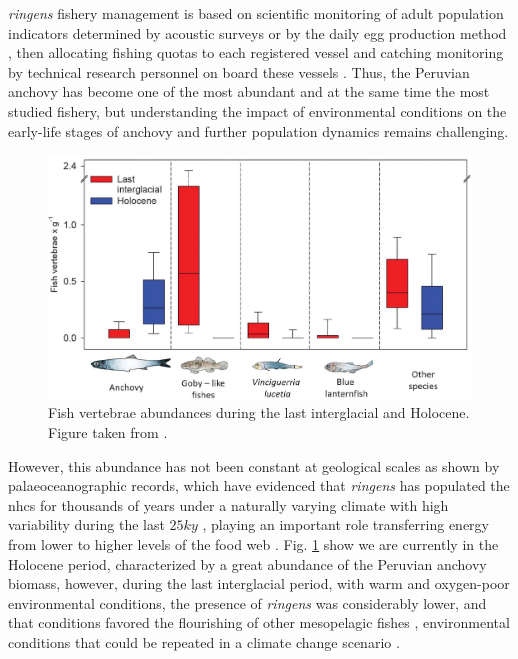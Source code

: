 \textit{\gls{ringens}} fishery management is based on scientific monitoring of adult population indicators determined by acoustic surveys \citep{GutiSwar2007} or by the daily egg production method \citep{Ayon2000}, then allocating fishing quotas to each registered vessel and catching monitoring by technical research personnel on board these vessels \citep{KroeSanc2019}. Thus, the Peruvian anchovy has become one of the most abundant and at the same time the most studied fishery, but understanding the impact of environmental conditions on the early-life stages of anchovy and further population dynamics remains challenging.\\

\begin{figure}[!]
	\includegraphics[width=1.0\textwidth]{figures/Chap1VertebraeAbundances.png}
	\centering
	\caption{Fish vertebrae abundances during the last interglacial and Holocene. Figure taken from \cite{Salv2022}.}
	\label{Chap1VertebraeAbundances}
\end{figure}

However, this abundance has not been constant at geological scales as shown by palaeoceanographic records, which have evidenced that \textit{\gls{ringens}} has populated the \acrshort{nhcs} for thousands of years under a naturally varying climate with high variability during the last $25 ky$ \citep{Salv2018,Salv2019,Salv2022}, playing an important role transferring energy from lower to higher levels of the food web \citep{ChecAsch2017}. Fig. \ref{Chap1VertebraeAbundances} show we are currently in the Holocene period, characterized by a great abundance of the Peruvian anchovy biomass, however, during the last interglacial period, with warm and oxygen-poor environmental conditions, the presence of \textit{\gls{ringens}} was considerably lower, and that conditions favored the flourishing of other mesopelagic fishes \citep{Salv2022}, environmental conditions that could be repeated in a climate change scenario \citep{EcheGeva2020}.\\

